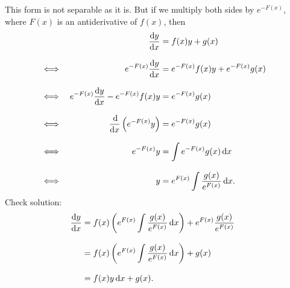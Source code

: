 \documentclass[MathsNotesBase.tex]{subfiles}
\begin{document}
{		\bigskip\bigskip
		This form is not separable as it is. But if we multiply both sides by $e^{-F(x)}$, where $F(x)$ is an antiderivative of $f(x)$, then
		\begin{align*}
		&& \frac{\dif y}{\dif x} &= f(x)y + g(x) \\[8pt]
		&\iff & e^{-F(x)}\frac{\dif y}{\dif x} &= e^{-F(x)}f(x)y + e^{-F(x)}g(x) &\sidecomment{} \\[8pt]
		&\iff & e^{-F(x)}\frac{\dif y}{\dif x} - e^{-F(x)}f(x)y &= e^{-F(x)}g(x) &\sidecomment{} \\[8pt]
		&\iff & \frac{\dif}{\dif x} \left(e^{-F(x)}y\right) &= e^{-F(x)}g(x) &\sidecomment{} \\[8pt]
		&\iff & e^{-F(x)}y &= \int e^{-F(x)}g(x) \dif x &\sidecomment{} \\[8pt]
		&\iff & y &= e^{F(x)}\int \frac{g(x)}{e^{F(x)}} \dif x. &\sidecomment{}
		\end{align*}
		Check solution:
		\begin{align*}
		\frac{\dif y}{\dif x} &= f(x)\left(e^{F(x)}\int \frac{g(x)}{e^{F(x)}} \dif x\right) + e^{F(x)}\frac{g(x)}{e^{F(x)}} \\[8pt]
		&= f(x)\left(e^{F(x)}\int \frac{g(x)}{e^{F(x)}} \dif x\right) + g(x) &\sidecomment{} \\[8pt]
		&= f(x)y \dif x + g(x).
		\end{align*}
	}
\end{document}
